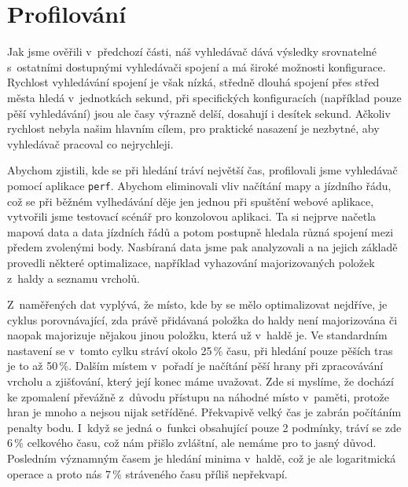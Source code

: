 \section{Profilování}
Jak jsme ověřili v~předchozí části, náš vyhledávač dává výsledky srovnatelné
s~ostatními dostupnými vyhledávači spojení a má široké možnosti konfigurace.
Rychlost vyhledávání spojení je však nízká, středně dlouhá spojení přes střed
města hledá v~jednotkách sekund, při specifických konfiguracích (například pouze
pěší vyhledávání) jsou ale časy výrazně delší, dosahují i desítek sekund.
Ačkoliv rychlost nebyla našim hlavním cílem, pro praktické nasazení je nezbytné,
aby vyhledávač pracoval co nejrychleji. 

Abychom zjistili, kde se při hledání tráví největší čas, profilovali jsme
vyhledávač pomocí aplikace {\tt perf}. Abychom eliminovali vliv načítání mapy a
jízdního řádu, což se při běžném vylhedávání děje jen jednou při spuštění webové
aplikace, vytvořili jsme testovací scénář pro konzolovou aplikaci. Ta si nejprve
načetla mapová data a data jízdních řádů a potom postupně hledala různá spojení
mezi předem zvolenými body. Nasbíraná data jsme pak analyzovali a na jejich
základě provedli některé optimalizace, například vyhazování majorizovaných
položek z~haldy a seznamu vrcholů.

Z~naměřených dat vyplývá, že místo, kde by se mělo optimalizovat nejdříve, je
cyklus porovnávající, zda právě přidávaná položka do haldy není majorizována či
naopak majorizuje nějakou jinou položku, která už v~haldě je. Ve standardním
nastavení se v~tomto cylku stráví okolo 25\,\% času, při hledání pouze pěších
tras je to až 50\,\%. Dalším místem v~pořadí je načítání pěší hrany při
zpracovávání vrcholu a zjišťování, který její konec máme uvažovat. Zde si
myslíme, že dochází ke zpomalení převážně z~důvodu přístupu na náhodné místo
v~paměti, protože hran je mnoho a nejsou nijak setříděné. Překvapivě velký čas je
zabrán počítáním penalty bodu. I~když se jedná o~funkci obsahující pouze 2
podmínky, tráví se zde 6\,\% celkového času, což nám přišlo zvláštní, ale nemáme
pro to jasný důvod. Posledním významným časem je hledání minima v~haldě, což je
ale logaritmická operace a proto nás 7\,\% stráveného času příliš nepřekvapí.


